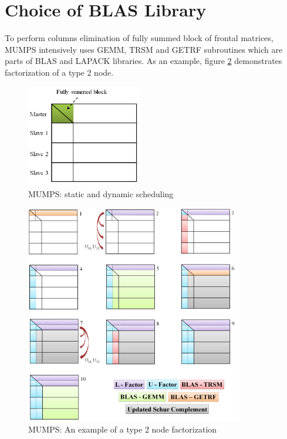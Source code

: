 \section{Choice of BLAS Library}
\label{subseq:blas-comparison}


To perform columns elimination of fully summed block of frontal matrices, MUMPS intensively uses GEMM, TRSM and GETRF subroutines which are parts of BLAS and LAPACK libraries. As an example, figure \ref{fig:mumps:steps-of-type-2-factorization} demonstrates factorization of a type 2 node.\\


\begin{figure}[htpb]
  \centering
  \includegraphics[width=0.45\textwidth]{figures/chapter-2/mumps-type-2-frontal-matrix.png}
\caption{MUMPS: static and dynamic scheduling}
\label{fig:mumps:type-2-frontal-matrix}
\end{figure}


\begin{figure}[htpb]
  \centering
  \includegraphics[width=0.85\textwidth]{figures/chapter-2/mumps-type-2-part-1.png}
\caption{MUMPS: An example of a type 2 node factorization}
\label{fig:mumps:steps-of-type-2-factorization}
\end{figure}


